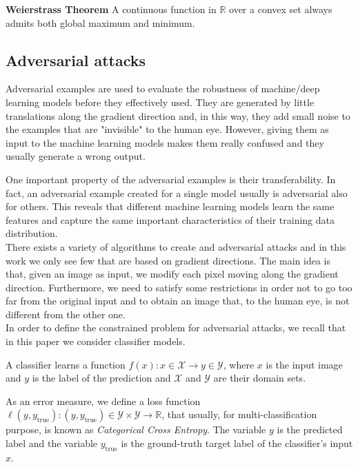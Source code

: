 \documentclass[10pt,twocolumn,letterpaper, english]{article}
\theoremstyle{definition}
\theoremstyle{plain}
\theoremstyle{plain}
\theoremstyle{plain}
\theoremstyle{plain}
\theoremstyle{remark}
\theoremstyle{remark}
\theoremstyle{definition}
\theoremstyle{definition}
\theoremstyle{definition}
\theoremstyle{definition}
\begin{document}
\textbf{Weierstrass Theorem} A continuous function in $\mathbb{R}$ over a convex set always admits both global maximum and minimum.

\subsection{Adversarial attacks}

Adversarial examples are used to evaluate the robustness of machine/deep learning models before they effectively used. 
They are generated by little translations along the gradient direction and, in this way, they add small noise to the examples that are "invisible" to the human eye. 
However, giving them as input to the machine learning models makes them really confused and they usually generate a wrong output. 

One important property of the adversarial examples is their transferability. 
In fact, an adversarial example created for a single model usually is adversarial also for others. 
This reveals that different machine learning models learn the same features and capture the same important characteristics of their training data distribution. \\ 

There exists a variety of algorithms to create and adversarial attacks and in this work we only see few that are based on gradient directions. 
The main idea is that, given an image as input, we modify each pixel moving along the gradient direction. 
Furthermore, we need to satisfy some restrictions in order not to go too far from the original input and to obtain an image that, to the human eye, is not different from the other one. \\

In order to define the constrained problem for adversarial attacks, we recall that in this paper we consider classifier models. 

A classifier learns a function $f(x): x \in \mathcal{X} \to y \in \mathcal{Y}$, where $x$ is the input image and $y$ is the label of the prediction and $\mathcal{X}$ and $\mathcal{Y}$ are their domain sets. 

As an error measure, we define a loss function $\ell(y, y_{\text{true}}): (y,y_{\text{true}}) \in \mathcal{Y} \times \mathcal{Y} \to \mathbb{R} $, that usually, for multi-classification purpose, is known as \textit{Categorical Cross Entropy}. 
The variable $y$ is the predicted label and the variable $y_{\text{true}}$ is the ground-truth target label of the classifier's input $x$. \\  
\end{document}
